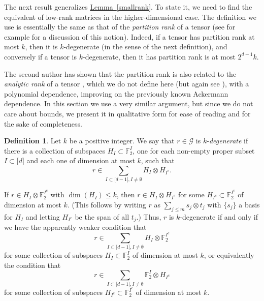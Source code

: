 \documentclass[11pt]{article}
\numberwithin{equation}{section}
\theoremstyle{definition}
\newtheorem{definition}[theorem]{Definition}
\theoremstyle{plain}
\newcommand{\expref}[2]{\hyperref[#2]{#1~\ref{#2}}}
\newcommand\F{\mathbb{F}}
\newcommand \cG{\mathcal G}
\newcommand \s{\subset}
\begin{document}
The next result generalizes \expref{Lemma}{smallrank}. To state it, we need to find the equivalent of low-rank matrices in the higher-dimensional case. The definition we use is essentially the same as that of the \emph{partition rank} of a tensor (see for example \cite{lovett} for a discussion of this notion). Indeed, if a tensor has partition rank at most $k$, then it is $k$-degenerate (in the sense of the next definition), and conversely if a tensor is $k$-degenerate, then it has partition rank is at most $2^{d-1}k$.

The second author has shown that the partition rank is also related to the \emph{analytic rank} of a tensor \cite{janzerpranktower,janzerprankpoly}, which we do not define here (but again see \cite{lovett}), with a polynomial dependence, improving on the previously known Ackermann dependence. In this section we use a very similar argument, but since we do not care about bounds, we present it in qualitative form for ease of reading and for the sake of completeness. 

\begin{definition}
  Let $k$ be a positive integer. We say that $r\in \cG$ is $k$-\emph{degenerate} if there is a collection of subspaces $H_I\subset\F_2^I$, one for each non-empty proper subset $I\s \lbrack d\rbrack$ and each one of dimension at most $k$, such that
  \[
    r\in \sum_{I\subset \lbrack d-1 \rbrack,I\neq \emptyset}H_I\otimes H_{I^c}.
  \]
\end{definition}

If $r\in H_I\otimes \F_2^{I^c}$ with $\dim(H_I)\leq k$, then $r\in H_I\otimes H_{I^c}$ for some $H_{I^c}\s \F_2^{I^c}$ of dimension at most $k$. (This follows by writing $r$ as $\sum_{j\leq m} s_j\otimes t_j$ with $\{s_j\}$ a basis for $H_I$ and letting $H_{I^c}$ be the span of all $t_j$.) Thus, $r$ is $k$-degenerate if and only if we have the apparently weaker condition that
\[
  r\in \sum_{I\s \lbrack d-1 \rbrack, I\neq \emptyset} H_I\otimes \F_2^{I^c}
\]
for some collection of subspaces $H_I\s \F_2^{I}$ of dimension at most
$k$, or equivalently the condition that
\[
  r\in \sum_{I\s \lbrack d-1 \rbrack, I\neq \emptyset} \F_2^{I}\otimes
  H_{I^c}
\]
for some collection of subspaces $H_{I^c}\s \F_2^{I^c}$ of dimension
at most $k$.
\end{document}

